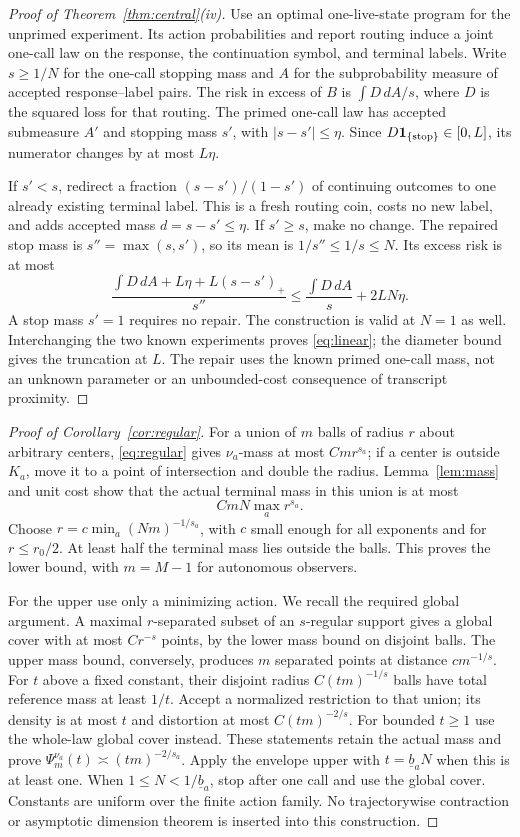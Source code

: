\begin{proof}[Proof of Theorem~\ref{thm:central}\textup{(iv)}]
Use an optimal one-live-state program for the unprimed experiment. Its action probabilities and report routing induce a joint one-call law on the response, the continuation symbol, and terminal labels. Write $s\ge1/N$ for the one-call stopping mass and $A$ for the subprobability measure of accepted response--label pairs. The risk in excess of $B$ is $\int D\,dA/s$, where $D$ is the squared loss for that routing. The primed one-call law has accepted submeasure $A'$ and stopping mass $s'$, with $|s-s'|\le\eta$. Since $D\mathbf1_{\{\text{stop}\}}\in[0,L]$, its numerator changes by at most $L\eta$.

If $s'<s$, redirect a fraction $(s-s')/(1-s')$ of continuing outcomes to one already existing terminal label. This is a fresh routing coin, costs no new label, and adds accepted mass $d=s-s'\le\eta$. If $s'\ge s$, make no change. The repaired stop mass is $s''=\max(s,s')$, so its mean is $1/s''\le1/s\le N$. Its excess risk is at most
\[
 \frac{\int D\,dA+L\eta+L(s-s')_+}{s''}
 \le \frac{\int D\,dA}{s}+2LN\eta.
\]
A stop mass $s'=1$ requires no repair. The construction is valid at $N=1$ as well. Interchanging the two known experiments proves \eqref{eq:linear}; the diameter bound gives the truncation at $L$. The repair uses the known primed one-call mass, not an unknown parameter or an unbounded-cost consequence of transcript proximity.
\end{proof}

\begin{proof}[Proof of Corollary~\ref{cor:regular}]
For a union of $m$ balls of radius $r$ about arbitrary centers, \eqref{eq:regular} gives $\nu_a$-mass at most $C m r^{s_a}$; if a center is outside $K_a$, move it to a point of intersection and double the radius. Lemma~\ref{lem:mass} and unit cost show that the actual terminal mass in this union is at most
\[
 C mN\max_a r^{s_a}.
\]
Choose $r=c\min_a(Nm)^{-1/s_a}$, with $c$ small enough for all exponents and for $r\le r_0/2$. At least half the terminal mass lies outside the balls. This proves the lower bound, with $m=M-1$ for autonomous observers.

For the upper use only a minimizing action. We recall the required global argument. A maximal $r$-separated subset of an $s$-regular support gives a global cover with at most $C r^{-s}$ points, by the lower mass bound on disjoint balls. The upper mass bound, conversely, produces $m$ separated points at distance $c m^{-1/s}$. For $t$ above a fixed constant, their disjoint radius $C(tm)^{-1/s}$ balls have total reference mass at least $1/t$. Accept a normalized restriction to that union; its density is at most $t$ and distortion at most $C(tm)^{-2/s}$. For bounded $t\ge1$ use the whole-law global cover instead. These statements retain the actual mass and prove $\Psi_m^{\nu_a}(t)\asymp(tm)^{-2/s_a}$. Apply the envelope upper with $t=\underline b_a N$ when this is at least one. When $1\le N<1/\underline b_a$, stop after one call and use the global cover. Constants are uniform over the finite action family. No trajectorywise contraction or asymptotic dimension theorem is inserted into this construction.
\end{proof}
